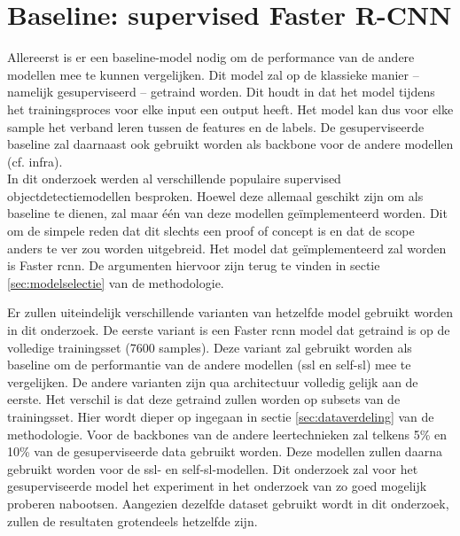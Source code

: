 \section{Baseline: supervised Faster R-CNN}

Allereerst is er een baseline-model nodig om de performance van de andere modellen mee te kunnen vergelijken. Dit model zal op de klassieke manier -- namelijk gesuperviseerd -- getraind worden. Dit houdt in dat het model tijdens het trainingsproces voor elke input een output heeft. Het model kan dus voor elke sample het verband leren tussen de features en de labels. De gesuperviseerde baseline zal daarnaast ook gebruikt worden als backbone voor de andere modellen (cf. infra). \\

In dit onderzoek werden al verschillende populaire supervised objectdetectiemodellen besproken. Hoewel deze allemaal geschikt zijn om als baseline te dienen, zal maar één van deze modellen geïmplementeerd worden. Dit om de simpele reden dat dit slechts een proof of concept is en dat de scope anders te ver zou worden uitgebreid. Het model dat geïmplementeerd zal worden is Faster \gls{rcnn}. De argumenten hiervoor zijn terug te vinden in sectie \ref{sec:modelselectie} van de methodologie.

Er zullen uiteindelijk verschillende varianten van hetzelfde model gebruikt worden in dit onderzoek. De eerste variant is een Faster \gls{rcnn} model dat getraind is op de volledige trainingsset (7600 samples). Deze variant zal gebruikt worden als baseline om de performantie van de andere modellen (\gls{ssl} en \gls{self-sl}) mee te vergelijken. De andere varianten zijn qua architectuur volledig gelijk aan de eerste. Het verschil is dat deze getraind zullen worden op subsets van de trainingsset. Hier wordt dieper op ingegaan in sectie \ref{sec:dataverdeling} van de methodologie. Voor de backbones van de andere leertechnieken zal telkens 5\% en 10\% van de gesuperviseerde data gebruikt worden. Deze modellen zullen daarna gebruikt worden voor de \gls{ssl}- en \gls{self-sl}-modellen. Dit onderzoek zal voor het gesuperviseerde model het experiment in het onderzoek van \textcite{Xie_2022} zo goed mogelijk proberen nabootsen. Aangezien dezelfde dataset gebruikt wordt in dit onderzoek, zullen de resultaten grotendeels hetzelfde zijn. \\

